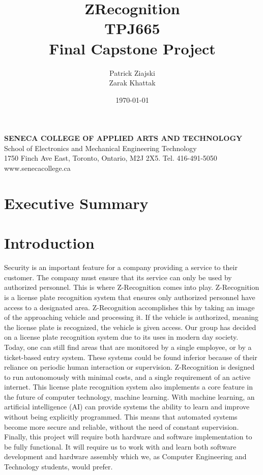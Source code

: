 \documentclass[a4paper,12pt]{article}
\title{ZRecognition\\TPJ665\\Final Capstone Project}
\author{Patrick Ziajski \\ Zarak Khattak}
\date{\today}
\begin{document}
\maketitle
\vfill
\begin{center}
    \textbf{SENECA COLLEGE OF APPLIED ARTS AND TECHNOLOGY}\\School of Electronics and Mechanical Engineering Technology\\1750 Finch Ave East, Toronto, Ontario, M2J 2X5. Tel. 416-491-5050\\www.senecacollege.ca
\end{center}
\thispagestyle{empty}

\newpage
\tableofcontents

\newpage
{}
\section{Executive Summary}

\newpage
\section{Introduction}
Security is an important feature for a company providing a service to their customer. The company must ensure that its service can only be used by authorized personnel. This is where Z-Recognition comes into play. Z-Recognition is a license plate recognition system that ensures only authorized personnel have access to a designated area. Z-Recognition accomplishes this by taking an image of the approaching vehicle and processing it. If the vehicle is authorized, meaning the license plate is recognized, the vehicle is given access. Our group has decided on a license plate recognition system due to its uses in modern day society. Today, one can still find areas that are monitored by a single employee, or by a ticket-based entry system. These systems could be found inferior because of their reliance on periodic human interaction or supervision. Z-Recognition is designed to run autonomously with minimal costs, and a single requirement of an active internet. This license plate recognition system also implements a core feature in the future of computer technology, machine learning. With machine learning, an artificial intelligence (AI) can provide systems the ability to learn and improve without being explicitly programmed. This means that automated systems become more secure and reliable, without the need of constant supervision. Finally, this project will require both hardware and software implementation to be fully functional. It will require us to work with and learn both software development and hardware assembly which we, as Computer Engineering and Technology students, would prefer.
\end{document}
